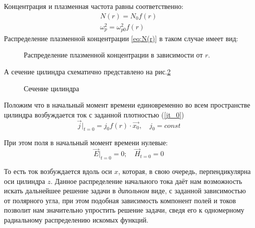 \documentclass[a4paper]{article}
\begin{document}
Концентрация и плазменная частота равны соответственно:
\begin{align}
	N(r)=N_{0}f(r)\label{eq:N(r)}\\
	\omega_p^2 = \omega_{p0}^{2} f(r)
	\label{eq:omega_p(r)}
\end{align}
\newpage
Распределение плазменной концентрации \eqref{eq:N(r)} в таком случае имеет вид:
\begin{figure}[H]
	\caption{Распределение плазменной концентрации в зависимости от $r$.}
	\label{ris:f(r)}
\end{figure}




А сечение цилиндра схематично представлено на рис.\ref{pic:cill}
\begin{figure}[H]
	\begin{center}
		
	\end{center}		
	\caption{Сечение цилиндра}
	\label{pic:cill}
\end{figure}

Положим что в начальный момент времени единовременно во всем пространстве цилиндра возбуждается ток с заданной плотностью (\ref{jt_0})
\begin{equation}
	\vec{j}|_{t=0}=j_0 f(r)\cdot\overrightarrow{x_0},\quad j_{0}=const
	\label{jt_0}
\end{equation}

При этом поля в начальный момент времени нулевые:
\begin{equation}
	\vec{E}|_{t=0}=0;\quad\vec{H}_{t=0}=0
\end{equation}

То есть ток возбуждается вдоль оси $x$, которая, в свою очередь, перпендикулярна оси цилиндра $z$. Данное распределение начального тока даёт нам возможность искать дальнейшее решение задачи в \textit{дипольном} виде, с заданной зависимостью от полярного угла, при этом подобная зависимость компонент полей и токов позволит нам значительно упростить решение задачи, сведя его к одномерному радиальному распределению искомых функций. 
\end{document}

